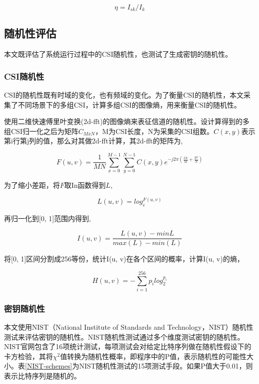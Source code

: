 \documentclass[master]{seuthesis} %
\begin{document}
\begin{Main}
\begin{equation} \label{safe_rate_equation}
  \eta = I_{sk} / I_k
\end{equation}

\subsection{随机性评估}

本文既评估了系统运行过程中的CSI随机性，也测试了生成密钥的随机性。

\subsubsection{CSI随机性}

CSI的随机性既有时域的变化，也有频域的变化。为了衡量CSI的随机性，本文采集了不同场景下的多组CSI，计算多组CSI的图像熵，用来衡量CSI的随机性。

使用二维快速傅里叶变换(2d-fft)的图像熵来表征信道的随机性。设计算得到的多组CSI归一化之后为矩阵$C_{MxN}$，M为CSI长度，N为采集的CSI组数。$C(x, y)$表示第i行第j列的值，那么对其做2d-fft计算，其2d-fft的矩阵为,

\begin{equation}
  F(u, v) = \frac{1}{MN}\sum_{x=0}^{M-1}\sum_{y=0}^{N-1} C(x,y) e^{-j2\pi(\frac{xu}{M}+\frac{yv}{N})}
\end{equation}


为了缩小差距，将$F$取In函数得到$L$,

\begin{equation}
  L(u, v) = log_e^{F(u, v)}
\end{equation}

再归一化到[0, 1]范围内得到,

\begin{equation}
  I(u, v) = \frac{L(u, v) - min{L}}{max(L) - min(L)}
\end{equation}

将[0, 1]区间分割成256等份，统计I(u, v)在各个区间的概率，计算I(u, v)的熵，

\begin{equation} \label{entropy_fft2d_equation}
  H(u, v) = -\sum_{i=1}^{256} p_i log_2^{p_i}
\end{equation}

\subsubsection{密钥随机性}

本文使用NIST（National Institute of Standards and Technology，NIST）随机性测试来评估密钥的随机性\cite{bassham2010statistical}。NIST随机性测试通过多个维度测试密钥的随机性\cite{zaman2012review}。NIST官网包含了16项统计测试，每项测试会对给定比特序列做在随机性假设下的卡方检验，其将$\chi^2$值转换为随机性概率，即程序中的P值，表示随机性的可能性大小。表\ref{NIST-schemes}为NIST随机性测试的15项测试手段。如果P值大于0.01，则表示比特序列是随机的。


\end{Main}
\end{document}
